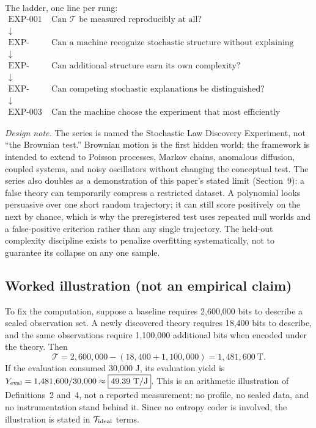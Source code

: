 \documentclass[11pt]{article}
\begin{document}
The ladder, one line per rung:
\[
\begin{array}{rl}
\text{EXP-001} & \text{Can \(\mathcal{T}\) be measured reproducibly at all?} \\
\downarrow & \\
\text{EXP-002A} & \text{Can a machine recognize stochastic structure without explaining noise?} \\
\downarrow & \\
\text{EXP-002B} & \text{Can additional structure earn its own complexity?} \\
\downarrow & \\
\text{EXP-002C} & \text{Can competing stochastic explanations be distinguished?} \\
\downarrow & \\
\text{EXP-003} & \text{Can the machine choose the experiment that most efficiently distinguishes them?}
\end{array}
\]

\textit{Design note.} The series is named the Stochastic Law Discovery Experiment, not ``the Brownian test.'' Brownian motion is the first hidden world; the framework is intended to extend to Poisson processes, Markov chains, anomalous diffusion, coupled systems, and noisy oscillators without changing the conceptual test. The series also doubles as a demonstration of this paper's stated limit (Section~9): a false theory can temporarily compress a restricted dataset. A polynomial looks persuasive over one short random trajectory; it can still score positively on the next by chance, which is why the preregistered test uses repeated null worlds and a false-positive criterion rather than any single trajectory. The held-out complexity discipline exists to penalize overfitting systematically, not to guarantee its collapse on any one sample.

\subsection{Worked illustration (not an empirical claim)}

To fix the computation, suppose a baseline requires 2,600,000 bits to describe a sealed observation set. A newly discovered theory requires 18,400 bits to describe, and the same observations require 1,100,000 additional bits when encoded under the theory. Then
\[
\mathcal{T} = 2{,}600{,}000 - (18{,}400 + 1{,}100{,}000) = \boxed{1{,}481{,}600\ \text{T}}.
\]
If the evaluation consumed 30,000 J, its evaluation yield is \(Y_{\rm eval} = 1{,}481{,}600 / 30{,}000 \approx \boxed{49.39\ \text{T/J}}\). This is an arithmetic illustration of Definitions~2 and~4, not a reported measurement: no profile, no sealed data, and no instrumentation stand behind it. Since no entropy coder is involved, the illustration is stated in \(\mathcal{T}_{\rm ideal}\) terms.
\end{document}
